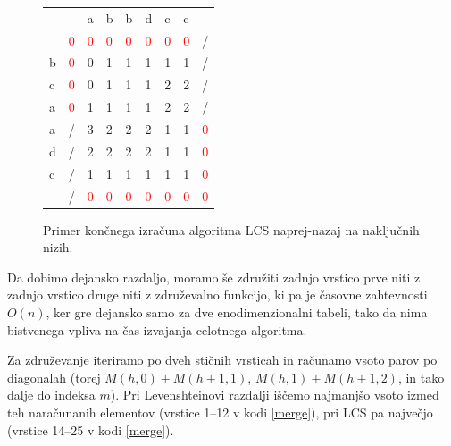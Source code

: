 \documentclass[a4paper,12pt,openright]{book}
\begin{document}
\begin{figure}[htb]
\centering
\begin{tabular}{|l|l|l|l|l|l|l|l|l|}
\cline{3-8}
  \multicolumn{2}{c|}{}  & a & b & b & d & c & c & \multicolumn{1}{|c}{} \\ \cline{2-9}
 \multicolumn{1}{c|}{} & \textcolor{red}{0} & \textcolor{red}{0} & \textcolor{red}{0} & \textcolor{red}{0} & \textcolor{red}{0} & \textcolor{red}{0} & \textcolor{red}{0} & / \\ \hline
b  & \textcolor{red}{0}  & 0 & 1 & 1 & 1 & 1 & 1 & / \\ \hline
c  & \textcolor{red}{0} & 0 & 1 & 1 & 1 & 2 & 2 & / \\ \hline
a  & \cellcolor{blue!15}\textcolor{red}{0} & \cellcolor{blue!15}1 & \cellcolor{blue!15}1 & \cellcolor{blue!15}1 & \cellcolor{blue!15}1 & \cellcolor{blue!15}2 & \cellcolor{blue!15}2 & / \\ \hline
a  & / & \cellcolor{blue!15}3  & \cellcolor{blue!15}2 &  \cellcolor{blue!15}2 & \cellcolor{blue!15}2 & \cellcolor{blue!15}1 & \cellcolor{blue!15}1 & \cellcolor{blue!15}\textcolor{red}{0} \\ \hline
d  & / & 2 & 2 & 2 & 2 & 1 & 1 & \textcolor{red}{0} \\ \hline
c  & / & 1 & 1 & 1 & 1 & 1 & 1 & \textcolor{red}{0} \\ \hline
\multicolumn{1}{c|}{}  & / & \textcolor{red}{0} & \textcolor{red}{0} & \textcolor{red}{0} & \textcolor{red}{0} & \textcolor{red}{0} & \textcolor{red}{0} & \textcolor{red}{0} \\ \cline{2-9}
\end{tabular}
\caption{Primer končnega izračuna algoritma LCS naprej-nazaj na naključnih nizih.}
\label{fbLCSresult}
\end{figure}

Da dobimo dejansko razdaljo, moramo še združiti zadnjo vrstico prve niti z zadnjo vrstico druge niti z združevalno funkcijo, ki pa je časovne zahtevnosti $O(n)$, ker gre dejansko samo za dve enodimenzionalni tabeli, tako da nima bistvenega vpliva na čas izvajanja celotnega algoritma. 

Za združevanje iteriramo po dveh stičnih vrsticah in računamo vsoto parov po diagonalah (torej $M(h, 0) + M(h+1, 1)$, $M(h, 1) + M(h+1, 2)$, in tako dalje do indeksa $m$). Pri Levenshteinovi razdalji iščemo najmanjšo vsoto izmed teh naračunanih elementov (vrstice 1--12 v kodi \ref{merge}), pri LCS pa največjo (vrstice 14--25 v kodi \ref{merge}). 
\end{document}
